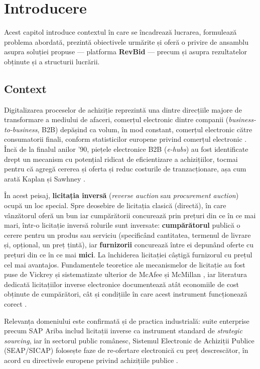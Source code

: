 \chapter{Introducere}\pagestyle{fancy}

Acest capitol introduce contextul în care se încadrează lucrarea, formulează problema abordată, prezintă obiectivele urmărite și oferă o privire de ansamblu asupra soluției propuse --- platforma \textbf{RevBid} --- precum și asupra rezultatelor obținute și a structurii lucrării.

\section{Context}

Digitalizarea proceselor de achiziție reprezintă una dintre direcțiile majore de transformare a mediului de afaceri, comerțul electronic dintre companii (\textit{business-to-business}, B2B) depășind ca volum, în mod constant, comerțul electronic către consumatorii finali, conform statisticilor europene privind comerțul electronic \cite{eurostatecom}. Încă de la finalul anilor '90, piețele electronice B2B (\textit{e-hubs}) au fost identificate drept un mecanism cu potențial ridicat de eficientizare a achizițiilor, tocmai pentru că agregă cererea și oferta și reduc costurile de tranzacționare, așa cum arată Kaplan și Sawhney \cite{kaplan2000}.

În acest peisaj, \textbf{licitația inversă} (\textit{reverse auction} sau \textit{procurement auction}) ocupă un loc special. Spre deosebire de licitația clasică (directă), în care vânzătorul oferă un bun iar cumpărătorii concurează prin prețuri din ce în ce mai mari, într-o licitație inversă rolurile sunt inversate: \textbf{cumpărătorul} publică o cerere pentru un produs sau serviciu (specificând cantitatea, termenul de livrare și, opțional, un preț țintă), iar \textbf{furnizorii} concurează între ei depunând oferte cu prețuri din ce în ce mai \textbf{mici}. La închiderea licitației câștigă furnizorul cu prețul cel mai avantajos. Fundamentele teoretice ale mecanismelor de licitație au fost puse de Vickrey \cite{vickrey1961} și sistematizate ulterior de McAfee și McMillan \cite{mcafee1987}, iar literatura dedicată licitațiilor inverse electronice documentează atât economiile de cost obținute de cumpărători, cât și condițiile în care acest instrument funcționează corect \cite{jap2002, smeltzer2003}.

Relevanța domeniului este confirmată și de practica industrială: suite enterprise precum SAP Ariba \cite{aribaweb} includ licitații inverse ca instrument standard de \textit{strategic sourcing}, iar în sectorul public românesc, Sistemul Electronic de Achiziții Publice (SEAP/SICAP) \cite{seapweb} folosește faze de re-ofertare electronică cu preț descrescător, în acord cu directivele europene privind achizițiile publice \cite{directive2014}.

